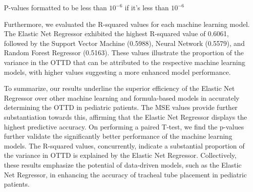 \documentclass[11pt]{article}
\begin{document}
\begin{table}[h]
\caption{Paired T-Test Comparison between Machine Learning and Formula-Based Model Predictions}
\label{table:p_values}
\begin{threeparttable}
\renewcommand{\TPTminimum}{\linewidth}
\begin{tablenotes}
\footnotesize
\item P-values formatted to be less than $10^{-6}$ if it's less than $10^{-6}$
\end{tablenotes}
\end{threeparttable}
\end{table}


Furthermore, we evaluated the R-squared values for each machine learning model. The Elastic Net Regressor exhibited the highest R-squared value of 0.6061, followed by the Support Vector Machine (0.5988), Neural Network (0.5579), and Random Forest Regressor (0.5163). These values illustrate the proportion of the variance in the OTTD that can be attributed to the respective machine learning models, with higher values suggesting a more enhanced model performance.

To summarize, our results underline the superior efficiency of the Elastic Net Regressor over other machine learning and formula-based models in accurately determining the OTTD in pediatric patients. The MSE values provide further substantiation towards this, affirming that the Elastic Net Regressor displays the highest predictive accuracy. On performing a paired T-test, we find the p-values further validate the significantly better performance of the machine learning models. The R-squared values, concurrently, indicate a substantial proportion of the variance in OTTD is explained by the Elastic Net Regressor. Collectively, these results emphasize the potential of data-driven models, such as the Elastic Net Regressor, in enhancing the accuracy of tracheal tube placement in pediatric patients.
\end{document}
